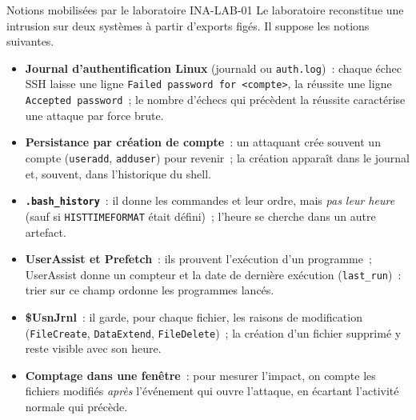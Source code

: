 \begin{boiteRemarque}{Notions mobilisées par le laboratoire INA-LAB-01}
Le laboratoire reconstitue une intrusion sur deux systèmes à partir
d'exports figés. Il suppose les notions suivantes.
\begin{itemize}
    \item \textbf{Journal d'authentification Linux} (journald ou
          \texttt{auth.log})~: chaque échec SSH laisse une ligne
          \texttt{Failed password for <compte>}, la réussite une ligne
          \texttt{Accepted password}~; le nombre d'échecs qui précèdent la
          réussite caractérise une attaque par force brute.
    \item \textbf{Persistance par création de compte}~: un attaquant crée
          souvent un compte (\texttt{useradd}, \texttt{adduser}) pour revenir~;
          la création apparaît dans le journal et, souvent, dans
          l'historique du shell.
    \item \textbf{\texttt{.bash\_history}}~: il donne les commandes et leur
          ordre, mais \emph{pas leur heure} (sauf si \texttt{HISTTIMEFORMAT}
          était défini)~; l'heure se cherche dans un autre artefact.
    \item \textbf{UserAssist et Prefetch}~: ils prouvent l'exécution d'un
          programme~; UserAssist donne un compteur et la date de dernière
          exécution (\texttt{last\_run})~: trier sur ce champ ordonne les
          programmes lancés.
    \item \textbf{\$UsnJrnl}~: il garde, pour chaque fichier, les raisons
          de modification (\texttt{FileCreate}, \texttt{DataExtend},
          \texttt{FileDelete})~; la création d'un fichier supprimé y reste
          visible avec son heure.
    \item \textbf{Comptage dans une fenêtre}~: pour mesurer l'impact, on
          compte les fichiers modifiés \emph{après} l'événement qui ouvre
          l'attaque, en écartant l'activité normale qui précède.
\end{itemize}
\end{boiteRemarque}

